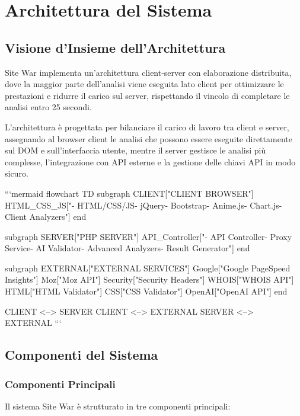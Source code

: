 \chapter{Architettura del Sistema}

\section{Visione d'Insieme dell'Architettura}
Site War implementa un'architettura client-server con elaborazione distribuita, dove la maggior parte dell'analisi viene eseguita lato client per ottimizzare le prestazioni e ridurre il carico sul server, rispettando il vincolo di completare le analisi entro 25 secondi.

L'architettura è progettata per bilanciare il carico di lavoro tra client e server, assegnando al browser client le analisi che possono essere eseguite direttamente sul DOM e sull'interfaccia utente, mentre il server gestisce le analisi più complesse, l'integrazione con API esterne e la gestione delle chiavi API in modo sicuro.

```mermaid
flowchart TD
    subgraph CLIENT["CLIENT BROWSER"]
        HTML_CSS_JS["- HTML/CSS/JS\n- jQuery\n- Bootstrap\n- Anime.js\n- Chart.js\n- Client Analyzers"]
    end
    
    subgraph SERVER["PHP SERVER"]
        API_Controller["- API Controller\n- Proxy Service\n- AI Validator\n- Advanced Analyzers\n- Result Generator"]
    end
    
    subgraph EXTERNAL["EXTERNAL SERVICES"]
        Google["Google PageSpeed Insights"]
        Moz["Moz API"]
        Security["Security Headers"]
        WHOIS["WHOIS API"]
        HTML["HTML Validator"]
        CSS["CSS Validator"]
        OpenAI["OpenAI API"]
    end
    
    CLIENT <--> SERVER
    CLIENT <--> EXTERNAL
    SERVER <--> EXTERNAL
```

\section{Componenti del Sistema}

\subsection{Componenti Principali}
Il sistema Site War è strutturato in tre componenti principali:

